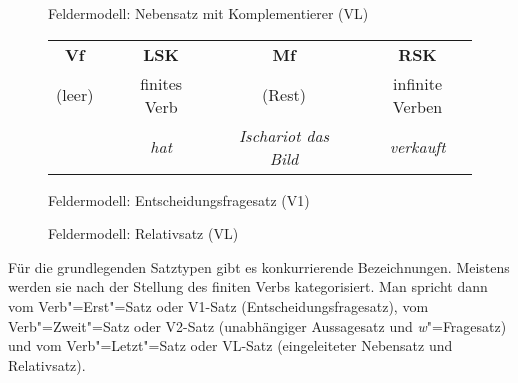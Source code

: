 \begin{figure}[h]
  \caption{Feldermodell: Nebensatz mit Komplementierer (VL)}
  \label{fig:feldertypen2}
\end{figure}

\begin{figure}[h]
    \begin{tabular}{cp{0.1em}cp{0.1em}cp{0.1em}c}
      \textbf{Vf} && \textbf{LSK} && \textbf{Mf} && \textbf{RSK} \\
      \cmidrule{1-1}\cmidrule{3-3}\cmidrule{5-5}\cmidrule{7-7}
	(leer) && finites Verb && (Rest) && infinite Verben \\
	&& \textit{hat} && \textit{Ischariot das Bild} && \textit{verkauft} \\
    \end{tabular}
  \caption{Feldermodell: Entscheidungsfragesatz (V1)}
  \label{fig:feldertypen3}
\end{figure}

\begin{figure}[h]
  \caption{Feldermodell: Relativsatz (VL)}
  \label{fig:feldertypen4}
\end{figure}


\begin{sloppypar}
Für die grundlegenden Satztypen gibt es konkurrierende Bezeichnungen.
Meistens werden sie nach der Stellung des finiten Verbs kategorisiert.
Man spricht dann vom Verb"=Erst"=Satz oder V1-Satz (Entscheidungsfragesatz), vom Verb"=Zweit"=Satz oder V2-Satz (unabhängiger Aussagesatz und \textit{w}"=Fragesatz) und vom Verb"=Letzt"=Satz oder VL-Satz (eingeleiteter Nebensatz und Relativsatz).
\end{sloppypar}

